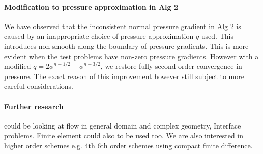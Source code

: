 \paragraph*{Modification to pressure approximation in Alg 2}
We have observed that the inconsistent normal pressure gradient in Alg 2 is caused by an inappropriate choice of pressure approximation $q$ used. This introduces non-smooth along the boundary of pressure gradients. This is more evident when the test problems have non-zero pressure gradients. However with a modified $q = 2\phi^{n-1/2} - \phi^{n-3/2}$, we restore fully second order convergence in pressure. The exact reason of this improvement however still subject to more careful considerations.

\paragraph*{Further research} could be looking at flow in general domain and complex geometry, Interface problems. Finite element could also to be used too. We are also interested in higher order schemes e.g. 4th 6th order schemes using compact finite difference.